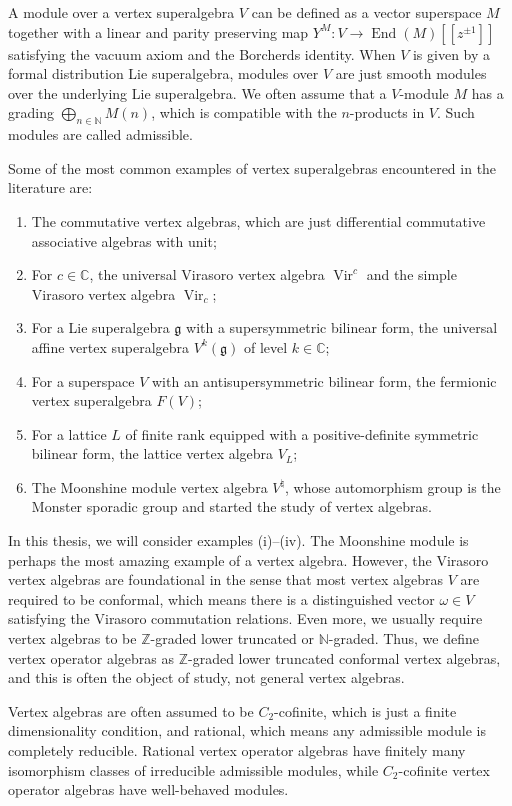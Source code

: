 \documentclass[a4paper, 12pt, reqno]{amsart}
\theoremstyle{remark}
\DeclareMathOperator{\Vir}{Vir}
\DeclareMathOperator{\End}{End}
\begin{document}
A module over a vertex superalgebra $V$ can be defined as a vector superspace $M$ together with a linear and parity preserving map $Y^M: V \to \End(M)[[z^{\pm 1}]]$ satisfying the vacuum axiom and the Borcherds identity.
When $V$ is given by a formal distribution Lie superalgebra, modules over $V$ are just smooth modules over the underlying Lie superalgebra.
We often assume that a $V$-module $M$ has a grading $\bigoplus_{n \in \mathbb{N}}M(n)$, which is compatible with the $n$-products in $V$.
Such modules are called admissible.

Some of the most common examples of vertex superalgebras encountered in the literature are:
\begin{enumerate}
\item The commutative vertex algebras, which are just differential commutative associative algebras with unit;
\item For $c \in \mathbb{C}$, the universal Virasoro vertex algebra $\Vir^c$ and the simple Virasoro vertex algebra $\Vir_c$;
\item For a Lie superalgebra $\mathfrak{g}$ with a supersymmetric bilinear form, the universal affine vertex superalgebra $V^k(\mathfrak{g})$ of level $k \in \mathbb{C}$;
\item For a superspace $V$ with an antisupersymmetric bilinear form, the fermionic vertex superalgebra $F(V)$;
\item For a lattice $L$ of finite rank equipped with a positive-definite symmetric bilinear form, the lattice vertex algebra $V_L$;
\item The Moonshine module vertex algebra $V^{\natural}$, whose automorphism group is the Monster sporadic group and started the study of vertex algebras.
\end{enumerate}
In this thesis, we will consider examples (i)--(iv).
The Moonshine module is perhaps the most amazing example of a vertex algebra.
However, the Virasoro vertex algebras are foundational in the sense that most vertex algebras $V$ are required to be conformal, which means there is a distinguished vector $\omega \in V$ satisfying the Virasoro commutation relations.
Even more, we usually require vertex algebras to be $\mathbb{Z}$-graded lower truncated or $\mathbb{N}$-graded.
Thus, we define vertex operator algebras as $\mathbb{Z}$-graded lower truncated conformal vertex algebras, and this is often the object of study, not general vertex algebras.

Vertex algebras are often assumed to be $C_2$-cofinite, which is just a finite dimensionality condition, and rational, which means any admissible module is completely reducible.
Rational vertex operator algebras have finitely many isomorphism classes of irreducible admissible modules, while $C_2$-cofinite vertex operator algebras have well-behaved modules.
\end{document}

